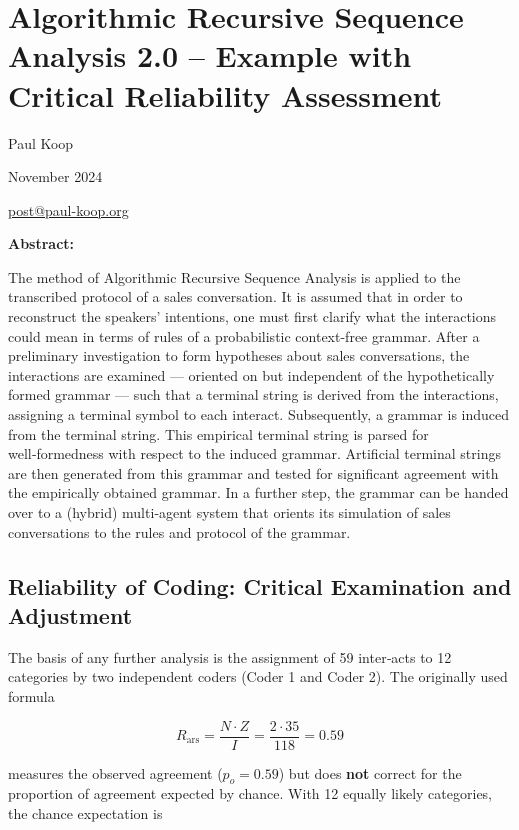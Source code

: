 \documentclass[
]{article}
\author{}
\date{}
\begin{document}
\section{\texorpdfstring{\textbf{Algorithmic Recursive Sequence Analysis 2.0 -- Example with Critical Reliability Assessment}}{Algorithmic Recursive Sequence Analysis 2.0 -- Example with Critical Reliability Assessment}}\label{algorithmic-recursive-sequence-analysis-2.0-example-with-critical-reliability-assessment}

Paul Koop

November 2024

\href{mailto:post@paul-koop.org}{\ul{post@paul-koop.org}}

\textbf{Abstract:}

The method of Algorithmic Recursive Sequence Analysis is applied to the transcribed protocol of a sales conversation. It is assumed that in order to reconstruct the speakers' intentions, one must first clarify what the interactions could mean in terms of rules of a probabilistic context-free grammar. After a preliminary investigation to form hypotheses about sales conversations, the interactions are examined — oriented on but independent of the hypothetically formed grammar — such that a terminal string is derived from the interactions, assigning a terminal symbol to each interact. Subsequently, a grammar is induced from the terminal string. This empirical terminal string is parsed for well‑formedness with respect to the induced grammar. Artificial terminal strings are then generated from this grammar and tested for significant agreement with the empirically obtained grammar. In a further step, the grammar can be handed over to a (hybrid) multi‑agent system that orients its simulation of sales conversations to the rules and protocol of the grammar.

\subsection{Reliability of Coding: Critical Examination and Adjustment}\label{reliability-of-coding-critical-examination-and-adjustment}

The basis of any further analysis is the assignment of 59 inter‑acts to 12 categories by two independent coders (Coder 1 and Coder 2). The originally used formula

\[
R_{\text{ars}} = \frac{N \cdot Z}{I} = \frac{2 \cdot 35}{118} = 0.59
\]

measures the observed agreement (\(p_o = 0.59\)) but does \textbf{not} correct for the proportion of agreement expected by chance. With 12 equally likely categories, the chance expectation is
\end{document}

